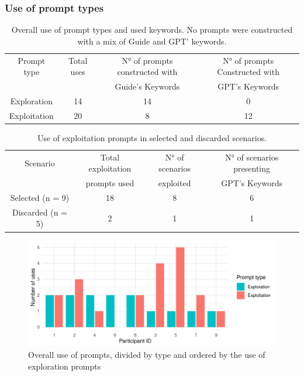\documentclass[sn-mathphys, Numbered]{sn-jnl}%
\theoremstyle{thmstyleone}%
\theoremstyle{thmstyletwo}%
\theoremstyle{thmstylethree}%
\begin{document}
\subsubsection*{Use of prompt types}
\begin{table}  \caption{Overall use of prompt types and used keywords. No prompts were constructed with a mix of Guide and GPT' keywords.}
    \centering
    \begin{tabular}{c|ccc}   
         Prompt type&  Total uses&  N° of prompts constructed with&  N° of prompts Constructed with\\
          & & Guide's Keywords& GPT's Keywords\\ \hline  
         Exploration&  14&  14&  0\\   
         Exploitation&  20&  8&  12\\ 
    \end{tabular}
    \label{tab:Xi vs Xr}
\end{table}

\begin{table}  \caption{Use of exploitation prompts in selected and discarded scenarios.}
    \centering
    \begin{tabular}{c|ccc}   
         Scenario &  Total exploitation &  N° of scenarios 
&  N° of scenarios presenting\\
           & prompts used& exploited& GPT's Keywords\\ \hline  
         Selected (n = 9)&  18&  8&  6\\   
         Discarded (n = 5)&  2&  1&  1\\ 
    \end{tabular}
    \label{tab:chosenvsnonchosen}
\end{table}



\begin{figure}
    \centering
    \includegraphics[width=1\linewidth]{XivxXp.pdf}
    \caption{Overall use of prompts, divided by type and ordered by the use of exploration prompts}
    \label{fig:XiXr}
\end{figure}
\end{document}
